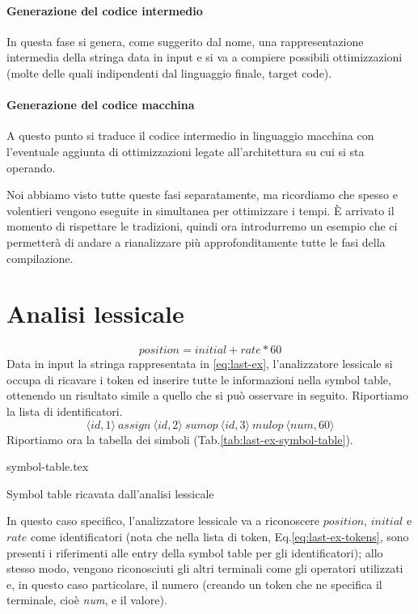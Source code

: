 \documentclass[class=book, crop=false, oneside, 12pt]{standalone}
\begin{document}
\paragraph{Generazione del codice intermedio} In questa fase si genera, come suggerito dal nome, una rappresentazione intermedia della stringa data in input e si va a compiere possibili ottimizzazioni (molte delle quali indipendenti dal linguaggio finale, target code).

\paragraph{Generazione del codice macchina}	A questo punto si traduce il codice intermedio in linguaggio macchina con l'eventuale aggiunta di ottimizzazioni legate all'architettura su cui si sta operando.
    
Noi abbiamo visto tutte queste fasi separatamente, ma ricordiamo che spesso e volentieri vengono eseguite in simultanea per ottimizzare i tempi.
È arrivato il momento di rispettare le tradizioni, quindi ora introdurremo un esempio che ci permetterà di andare a rianalizzare più approfonditamente tutte le fasi della compilazione.
\section{Analisi lessicale}
\begin{equation}
    \label{eq:last-ex}
    position = initial + rate * 60
\end{equation}
Data in input la stringa rappresentata in \ref{eq:last-ex}, l'analizzatore lessicale si occupa di ricavare i token ed inserire tutte le informazioni nella symbol table, ottenendo un risultato simile a quello che si può osservare in seguito.
Riportiamo la lista di identificatori.
\begin{equation}
    \label{eq:last-ex-tokens}
    \langle id,1 \rangle \ assign \ \langle id,2 \rangle \ sumop \ \langle id,3 \rangle \ mulop \ \langle num,60 \rangle
\end{equation}
Riportiamo ora la tabella dei simboli (Tab.\ref{tab:last-ex-symbol-table}).
\begin{table}[H]
	\centering
	{symbol-table.tex}
    \caption{Symbol table ricavata dall'analisi lessicale}
    \label{tab:last-ex-symbol-table}
\end{table} 

In questo caso specifico, l'analizzatore lessicale va a riconoscere \(position\), \(initial\) e \(rate\) come identificatori (nota che nella lista di token, Eq.\ref{eq:last-ex-tokens}, sono presenti i riferimenti alle entry della symbol table per gli identificatori); allo stesso modo, vengono riconosciuti gli altri terminali come gli operatori utilizzati e, in questo caso particolare, il numero (creando un token che ne specifica il terminale, cioè \emph{num}, e il valore).
\end{document}
